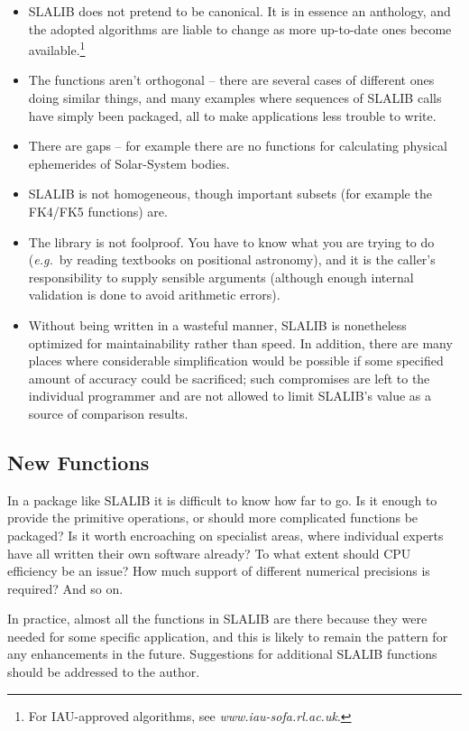 \documentclass[11pt,fleqn,twoside]{article}
\renewcommand{\_}{{\tt\char'137}}     %
\begin{document}
\begin{itemize}
\item SLALIB does not pretend to be canonical.  It is in essence
an anthology, and the adopted algorithms are liable
to change as more up-to-date ones become available.\footnote{For
IAU-approved algorithms, see {\it www.iau-sofa.rl.ac.uk}.}
\item The functions aren't orthogonal -- there are several
cases of different
ones doing similar things, and many examples where
sequences of SLALIB calls have simply been packaged, all to
make applications less trouble to write.
\item There are gaps -- for example there are no functions for
calculating physical ephemerides of Solar-System bodies.
\item SLALIB is not homogeneous, though important subsets
(for example the FK4/FK5 functions) are.
\item The library is not foolproof.  You have to know what
you are trying to do ({\it e.g.}\ by reading textbooks on positional
astronomy), and it is the caller's responsibility to supply
sensible arguments (although enough internal validation is done to
avoid arithmetic errors).
\item Without being written in a wasteful
manner, SLALIB is nonetheless optimized for maintainability
rather than speed.  In addition, there are many places
where considerable simplification would be possible if some
specified amount of accuracy could be sacrificed;  such
compromises are left to the individual programmer and
are not allowed to limit SLALIB's value as a source
of comparison results.
\end{itemize}
 
\subsection{New Functions}
In a package like SLALIB it is difficult to know how far to go.  Is it
enough to provide the primitive operations, or should more
complicated functions be packaged?  Is it worth encroaching on
specialist areas, where individual experts have all written their
own software already?  To what extent should CPU efficiency be
an issue?  How much support of different numerical precisions is
required?  And so on.
 
In practice, almost all the functions in SLALIB are there because they were
needed for some specific application, and this is likely to remain the
pattern for any enhancements in the future.
Suggestions for additional SLALIB functions should be addressed to the
author.
 
\end{document}
